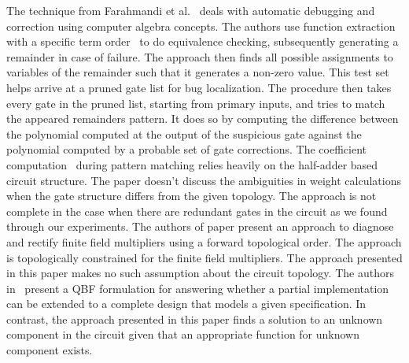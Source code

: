 The technique from Farahmandi et al.~\cite{farimah:2016} deals with
automatic debugging and correction using computer algebra
concepts. The authors use function extraction~\cite{maciej:2015:1}
with a specific term order~\cite{lv} to do equivalence checking,
subsequently generating a remainder in case of failure. The approach
then finds all possible assignments to variables of the remainder such
that it generates a non-zero value. This test set helps arrive at a
pruned gate list for bug localization. The procedure then takes every
gate in the pruned list, starting from primary inputs, and tries to
match the appeared remainders pattern. It does so by computing the
difference between the polynomial computed at the output of the
suspicious gate against the polynomial computed by a probable set of
gate corrections. The coefficient computation~\cite{maciej:2015:2}
during pattern matching relies heavily on the half-adder based circuit
structure. The paper doesn't discuss the ambiguities in weight
calculations when the gate structure differs from the given
topology. The approach is not complete in the case when there are
redundant gates in the circuit as we found through our
experiments. The authors of paper \cite{maciej:2018} present an approach to 
diagnose and rectify finite field multipliers using a forward topological 
order. The approach is topologically constrained for the finite field 
multipliers. The approach presented in this paper makes no such assumption 
about the circuit topology. The authors in~\cite{scholl:2} present a QBF 
formulation for answering whether a partial implementation can be extended 
to a complete design that models a given specification. In contrast, the approach 
presented in this paper finds a solution to an unknown component in the 
circuit given that an appropriate function for unknown component exists.




